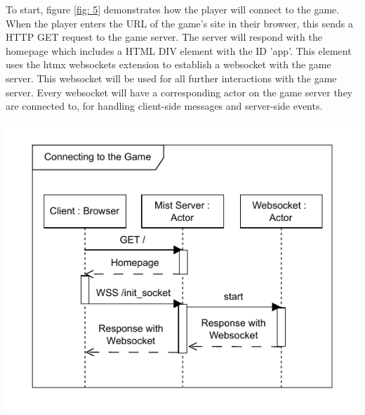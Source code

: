 \documentclass[]{final}
\begin{document}
\noindent
\begin{minipage}[t]{18em}
  \vspace*{-6cm}

  To start, figure \ref{fig: 5} demonstrates how the player will connect to the game.
  When the player enters the URL of the game's site in their browser, this sends a HTTP
  GET request to the game server. The server will respond with the homepage which
  includes a HTML DIV element with the ID 'app'. This element uses the htmx websockets
  extension to establish a websocket with the game server. This websocket will be
  used for all further interactions with the game server. Every websocket will have a corresponding
  actor on the game server they are connected to, for handling client-side messages and
  server-side events.
\end{minipage}
\hfill
\begin{minipage}[t]{20em}
  \includegraphics[width=\textwidth]{sequence_connecting}
  \label{fig: 5}
\end{minipage}

\newpage
\end{document}
